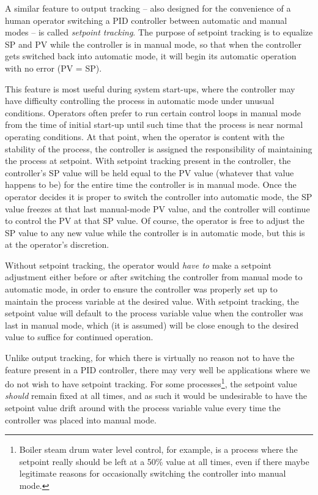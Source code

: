 \vskip 10pt

A similar feature to output tracking -- also designed for the convenience of a human operator switching a PID controller between automatic and manual modes -- is called \textit{setpoint tracking}.  The purpose of setpoint tracking is to equalize SP and PV while the controller is in manual mode, so that when the controller gets switched back into automatic mode, it will begin its automatic operation with no error (PV = SP).  

This feature is most useful during system start-ups, where the controller may have difficulty controlling the process in automatic mode under unusual conditions.  Operators often prefer to run certain control loops in manual mode from the time of initial start-up until such time that the process is near normal operating conditions.  At that point, when the operator is content with the stability of the process, the controller is assigned the responsibility of maintaining the process at setpoint.  With setpoint tracking present in the controller, the controller's SP value will be held equal to the PV value (whatever that value happens to be) for the entire time the controller is in manual mode.  Once the operator decides it is proper to switch the controller into automatic mode, the SP value freezes at that last manual-mode PV value, and the controller will continue to control the PV at that SP value.  Of course, the operator is free to adjust the SP value to any new value while the controller is in automatic mode, but this is at the operator's discretion.

Without setpoint tracking, the operator would \textit{have to} make a setpoint adjustment either before or after switching the controller from manual mode to automatic mode, in order to ensure the controller was properly set up to maintain the process variable at the desired value.  With setpoint tracking, the setpoint value will default to the process variable value when the controller was last in manual mode, which (it is assumed) will be close enough to the desired value to suffice for continued operation.

Unlike output tracking, for which there is virtually no reason not to have the feature present in a PID controller, there may very well be applications where we do not wish to have setpoint tracking.  For some processes\footnote{Boiler steam drum water level control, for example, is a process where the setpoint really should be left at a 50\% value at all times, even if there maybe legitimate reasons for occasionally switching the controller into manual mode.}, the setpoint value \textit{should} remain fixed at all times, and as such it would be undesirable to have the setpoint value drift around with the process variable value every time the controller was placed into manual mode.







